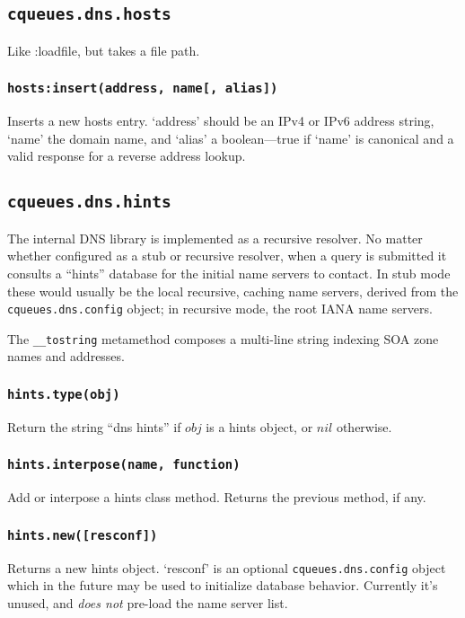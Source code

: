 \documentclass[11pt, oneside]{memoir}
\newcommand*{\routine}[1]{\texttt{#1}\xspace}
\newcommand*{\fn}[1]{\texttt{#1}\xspace}
\newcommand*{\module}[1]{\texttt{#1}\xspace}
\newcounter{toccols}
\newenvironment{Module}[1]{
	\subsection{\texttt{#1}}
	\addtocontents{toc}{
		\protect\begin{multicols}{\value{toccols}}
	}
}{
	\addtocontents{toc}{\protect\end{multicols}}
}
\begin{document}
\begin{Module}{cqueues.dns.hosts}
Like :loadfile, but takes a file path.

\subsubsection[\fn{hosts:insert}]{\fn{hosts:insert(address, name[, alias])}}

Inserts a new hosts entry. `address' should be an IPv4 or IPv6 address string, `name' the domain name, and `alias' a boolean---true if `name' is canonical and a valid response for a reverse address lookup.

\end{Module}


\begin{Module}{cqueues.dns.hints}

The internal DNS library is implemented as a recursive resolver. No matter whether configured as a stub or recursive resolver, when a query is submitted it consults a ``hints'' database for the initial name servers to contact. In stub mode these would usually be the local recursive, caching name servers, derived from the \module{cqueues.dns.config} object; in recursive mode, the root IANA name servers.

The \fn{\_\_tostring} metamethod composes a multi-line string indexing SOA zone names and addresses.

\subsubsection[\routine{hints.type}]{\routine{hints.type(obj)}}
Return the string ``dns hints'' if $obj$ is a hints object, or $nil$ otherwise.

\subsubsection[\fn{hints.interpose}]{\fn{hints.interpose(name, function)}}

Add or interpose a hints class method. Returns the previous method, if any.

\subsubsection[\fn{hints.new}]{\fn{hints.new([resconf])}}

Returns a new hints object. `resconf' is an optional \module{cqueues.dns.config} object which in the future may be used to initialize database behavior. Currently it's unused, and \emph{does not} pre-load the name server list.


\end{Module}
\end{document}
